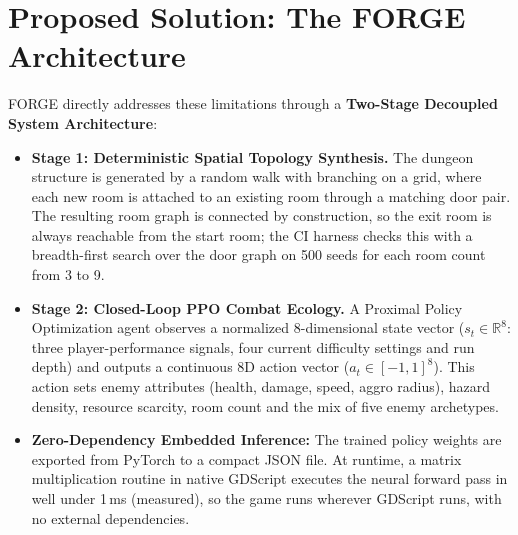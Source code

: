 \section{Proposed Solution: The FORGE Architecture}\label{sec:proposed}
FORGE directly addresses these limitations through a \textbf{Two-Stage Decoupled System Architecture}:
\begin{itemize}
    \item \textbf{Stage 1: Deterministic Spatial Topology Synthesis.} The dungeon structure is generated by a random walk with branching on a grid, where each new room is attached to an existing room through a matching door pair. The resulting room graph is connected by construction, so the exit room is always reachable from the start room; the CI harness checks this with a breadth-first search over the door graph on 500 seeds for each room count from 3 to 9.
    \item \textbf{Stage 2: Closed-Loop PPO Combat Ecology.} A Proximal Policy Optimization agent observes a normalized 8-dimensional state vector ($s_t \in \mathbb{R}^8$: three player-performance signals, four current difficulty settings and run depth) and outputs a continuous 8D action vector ($a_t \in [-1, 1]^8$). This action sets enemy attributes (health, damage, speed, aggro radius), hazard density, resource scarcity, room count and the mix of five enemy archetypes.
    \item \textbf{Zero-Dependency Embedded Inference:} The trained policy weights are exported from PyTorch to a compact JSON file. At runtime, a matrix multiplication routine in native GDScript executes the neural forward pass in well under 1\,ms (measured), so the game runs wherever GDScript runs, with no external dependencies.
\end{itemize}

